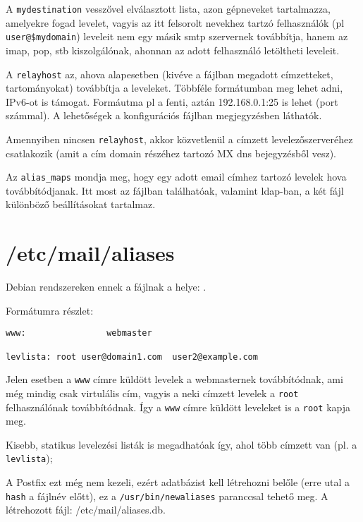 A \texttt{mydestination} vesszővel elválasztott lista, azon gépneveket tartalmazza, amelyekre fogad levelet, vagyis az
itt felsorolt nevekhez tartzó felhasználók (pl \texttt{user@\$mydomain}) leveleit nem egy másik smtp szervernek
továbbítja, hanem az imap, pop, stb kiszolgálónak, ahonnan az adott felhasználó letöltheti leveleit.

A \texttt{relayhost} az, ahova alapesetben (kivéve a  fájlban megadott címzetteket,
tartományokat) továbbítja a leveleket. Többféle formátumban meg lehet adni, IPv6-ot is támogat. Formáutma pl a fenti,
aztán 192.168.0.1:25 is lehet (port számmal). A lehetőségek a konfigurációs fájlban megjegyzésben láthatók.

Amennyiben nincsen \texttt{relayhost}, akkor közvetlenül a címzett levelezőszerveréhez csatlakozik (amit a cím domain
részéhez tartozó MX dns bejegyzésből vesz).

Az \texttt{alias\_maps} mondja meg, hogy egy adott email címhez tartozó levelek hova továbbítódjanak. Itt most az
 fájlban találhatóak, valamint ldap-ban, a két fájl különböző beállításokat tartalmaz.

\section{/etc/mail/aliases}
Debian rendszereken ennek a fájlnak a helye: .

Formátumra részlet:\\
\begin{Verbatim}[frame=single,label=aliases részlet]
www:                webmaster

levlista: root user@domain1.com  user2@example.com
\end{Verbatim}

Jelen esetben a \texttt{www} címre küldött levelek a webmasternek továbbítódnak, ami még mindig csak virtulális cím,
vagyis a neki címzett levelek a \texttt{root} felhasználónak továbbítódnak. Így a \texttt{www} címre küldött leveleket
is a \texttt{root} kapja meg.

Kisebb, statikus levelezési listák is megadhatóak így, ahol több címzett van (pl. a \texttt{levlista});

A Postfix ezt még nem kezeli, ezért adatbázist kell létrehozni belőle (erre utal a \texttt{hash} a fájlnév előtt), ez
a \texttt{/usr/bin/newaliases} paranccsal tehető meg. A létrehozott fájl: /etc/mail/aliases.db.



